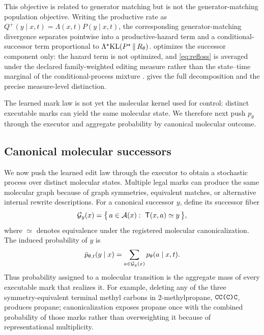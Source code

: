This objective is related to generator matching but is not the generator-matching population objective. Writing the productive rate as $Q^{+}(y\mid x,t)=\Lambda(x,t)P(y\mid x,t)$, the corresponding generator-matching divergence separates pointwise into a productive-hazard term and a conditional-successor term proportional to $\Lambda^{\star}\mathrm{KL}(P^{\star}\,\|\,R_\theta)$. \method{} optimizes the successor component only: the hazard term is not optimized, and \cref{eq:refloss} is averaged under the declared family-weighted editing measure rather than the state--time marginal of the conditional-process mixture \citep{holderrieth2025generator}.  gives the full decomposition and the precise measure-level distinction.

The learned mark law is not yet the molecular kernel used for control: distinct executable marks can yield the same molecular state. We therefore next push $p_\theta$ through the executor and aggregate probability by canonical molecular outcome.

\subsection{Canonical molecular successors}
\label{sec:canonical}

We now push the learned edit law through the executor to obtain a stochastic process over distinct molecular states. Multiple legal marks can produce the same molecular graph because of graph symmetries, equivalent matches, or alternative internal rewrite descriptions. For a canonical successor $y$, define its successor fiber
\begin{equation}
\mathcal{G}_y(x)=\bigl\{\,a\in\mathcal{A}(x):\ \mathsf{T}(x,a)\simeq y\,\bigr\},
\label{eq:sucfiber}
\end{equation}
where $\simeq$ denotes equivalence under the registered molecular canonicalization. The induced probability of $y$ is
\begin{equation}
\bar p_{\theta,t}(y\mid x)=\sum_{a\in\mathcal{G}_y(x)}p_\theta(a\mid x,t).
\label{eq:pushforward}
\end{equation}
Thus probability assigned to a molecular transition is the aggregate mass of every executable mark that realizes it. For example, deleting any of the three symmetry-equivalent terminal methyl carbons in 2-methylpropane, $\texttt{CC(C)C}$, produces propane; canonicalization exposes propane once with the combined probability of those marks rather than overweighting it because of representational multiplicity.


